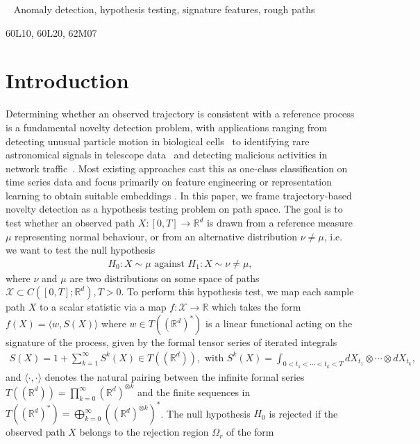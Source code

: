 \documentclass[twoside,11pt]{article}
\numberwithin{equation}{section}
\numberwithin{theorem}{section}
\newcommand{\R}{\mathbb{R}}
\newcommand{\X}{\mathcal{X}}
\renewenvironment{keywords}{%
\par\noindent{\bf Keywords:}\ }%
{\par\vskip0pt} %
\begin{document}
\begin{keywords}
 Anomaly detection, hypothesis testing, signature features, rough paths
\end{keywords}
\begin{msc}
 60L10, 60L20, 62M07   
\end{msc}  
\tableofcontents

\section{Introduction}


\medskip \noindent
Determining whether an observed trajectory is consistent with a reference process is a fundamental novelty detection problem, with applications ranging from detecting unusual particle motion in biological cells~\citep{munoz2021unsupervised} to identifying rare astronomical signals in telescope data~\citep{wilensky2019absolving} and detecting malicious activities in network traffic~\citep{cochrane2021sk}. Most existing approaches cast this as one-class classification on time series data and focus primarily on feature engineering or representation learning to obtain suitable embeddings \citep{li2023deep,zamanzadeh2024deep}. In this paper, we frame trajectory-based novelty detection as a hypothesis testing problem on path space. The goal is to test whether an observed path $X:[0,T]\to\R^d$ is drawn from a reference measure $\mu$ representing normal behaviour, or from an alternative distribution $\nu\neq\mu$, i.e. we want to test the null hypothesis
\begin{align*}
    H_0:X\sim \mu \text{ against } H_1:X\sim \nu\neq \mu,
\end{align*} 
where $\nu$ and $\mu$ are two distributions on some space of paths $\X\subset C([0,T];\R^d), T>0$. To perform this hypothesis test, we map each sample path $X$ to a scalar statistic via a map $f:\X\to\R$ which takes the form $f(X)=\langle w, S(X)\rangle$ where $w\in T((\R^d)^*)$ is a linear functional acting on the signature of the process, given by the formal tensor
series of iterated integrals
\begin{align*}
    S(X)=1+\sum_{k=1}^{\infty}S^k(X)\in T((\R^d)),
    \text{ with } S^k(X)=\int_{0<t_1<\cdots<t_k<T} dX_{t_1}\otimes\cdots \otimes dX_{t_k},
\end{align*}
and $\langle\cdot,\cdot\rangle$ denotes the natural pairing between the infinite formal series $T((\R^d))=\prod_{k=0}^{\infty} (\R^d)^{\otimes k}$ and the finite sequences in $T((\R^d)^*)=\bigoplus_{k=0}^{\infty}((\R^d)^{\otimes k})^*$. The null hypothesis $H_0$ is rejected if the observed path $X$ belongs to the rejection region $\Omega_r$ of the form
\end{document}
